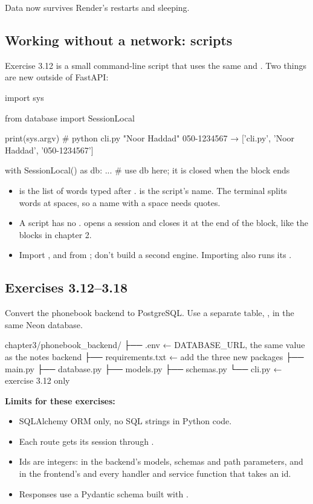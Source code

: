Data now survives Render's restarts and sleeping.

\subsection{Working without a network: scripts}

Exercise 3.12 is a small command-line script that uses the same  and . Two things are new outside of FastAPI:

\begin{py}
import sys

from database import SessionLocal

print(sys.argv)     # python cli.py "Noor Haddad" 050-1234567  →  ['cli.py', 'Noor Haddad', '050-1234567']

with SessionLocal() as db:
	...             # use db here; it is closed when the block ends
\end{py}

\begin{itemize}
\item {} is the list of words typed after .  is the script's name. The terminal splits words at spaces, so a name with a space needs quotes.
\item A script has no .  opens a session and closes it at the end of the block, like the  blocks in chapter 2.
\item Import ,  and  from ; don't build a second engine. Importing  also runs its .
\end{itemize}

\subsection{Exercises 3.12--3.18}

Convert the phonebook backend to PostgreSQL. Use a separate table, , in the same Neon database.

\begin{code}
chapter3/phonebook_backend/
├── .env                ← DATABASE_URL, the same value as the notes backend
├── requirements.txt    ← add the three new packages
├── main.py
├── database.py
├── models.py
├── schemas.py
└── cli.py              ← exercise 3.12 only
\end{code}

\textbf{Limits for these exercises:}
\begin{itemize}
\item SQLAlchemy ORM only, no SQL strings in Python code.
\item Each route gets its session through .
\item Ids are integers: in the backend's models, schemas and path parameters, and in the frontend's  and every handler and service function that takes an id.
\item Responses use a Pydantic schema built with .
\end{itemize}

